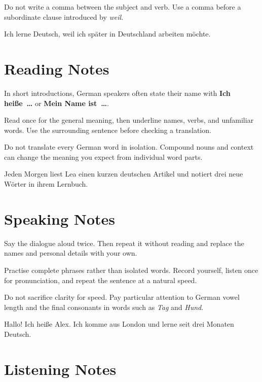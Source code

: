 \documentclass[11pt,openany]{book}
\newcommand{\GermanText}[1]{\textbf{#1}}
\newcommand{\LessonSection}[1]{\section{#1}}
\begin{document}
\begin{WarningBox}
Do not write a comma between the subject and verb. Use a comma before a
subordinate clause introduced by \emph{weil}.
\end{WarningBox}

\begin{QuoteBox}
Ich lerne Deutsch, weil ich später in Deutschland arbeiten möchte.
\end{QuoteBox} %
\LessonSection{Reading Notes}

In short introductions, German speakers often state their name with
\GermanText{Ich heiße~\ldots} or \GermanText{Mein Name ist~\ldots}.

\begin{InformationBox}
Read once for the general meaning, then underline names, verbs, and unfamiliar
words. Use the surrounding sentence before checking a translation.
\end{InformationBox}

\begin{WarningBox}
Do not translate every German word in isolation. Compound nouns and context can
change the meaning you expect from individual word parts.
\end{WarningBox}

\begin{QuoteBox}
Jeden Morgen liest Lea einen kurzen deutschen Artikel und notiert drei neue
Wörter in ihrem Lernbuch.
\end{QuoteBox} %
\LessonSection{Speaking Notes}

Say the dialogue aloud twice. Then repeat it without reading and replace the
names and personal details with your own.

\begin{InformationBox}
Practise complete phrases rather than isolated words. Record yourself, listen
once for pronunciation, and repeat the sentence at a natural speed.
\end{InformationBox}

\begin{WarningBox}
Do not sacrifice clarity for speed. Pay particular attention to German vowel
length and the final consonants in words such as \emph{Tag} and \emph{Hund}.
\end{WarningBox}

\begin{QuoteBox}
Hallo! Ich heiße Alex. Ich komme aus London und lerne seit drei Monaten Deutsch.
\end{QuoteBox} %
\LessonSection{Listening Notes}
\end{document}
